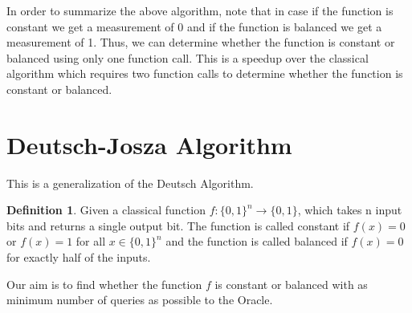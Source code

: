 \documentclass[12pt, oneside]{book}
\theoremstyle{definition}
\newtheorem{definition}{Definition}[section]
\theoremstyle{definition}
\theoremstyle{remark}
\begin{document}
In order to summarize the above algorithm, note that in case if the function is constant we get a measurement of 0 and if the function is balanced we get a measurement of 1. Thus, we can determine whether the function is constant or balanced using only one function call. This is a speedup over the classical algorithm which requires two function calls to determine whether the function is constant or balanced.



\section{Deutsch-Josza Algorithm}
This is a generalization of the Deutsch Algorithm.
\begin{definition}
    Given a classical function $f:\{0,1\}^n \rightarrow \{0,1\}$, which takes n input bits and returns a single output bit.
    The function is called constant if $f(x)=0$ or $f(x)=1$ for all $x \in \{0,1\}^n$ and the function is called balanced if $f(x)=0$ for exactly half of the inputs.
\end{definition}

Our aim is to find whether the function $f$ is constant or balanced with as minimum number of queries as possible to the Oracle.
\end{document}

